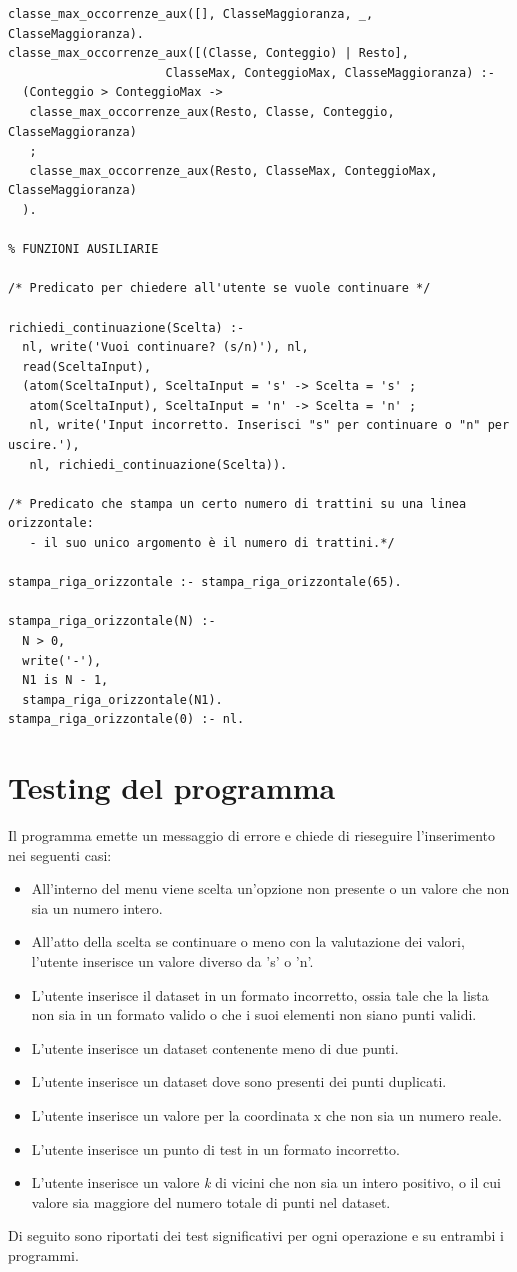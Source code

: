 \documentclass[11pt]{article}
\theoremstyle{definition}
\begin{document}
\begin{verbatim}
classe_max_occorrenze_aux([], ClasseMaggioranza, _, ClasseMaggioranza).
classe_max_occorrenze_aux([(Classe, Conteggio) | Resto], 
                      ClasseMax, ConteggioMax, ClasseMaggioranza) :-
  (Conteggio > ConteggioMax ->
   classe_max_occorrenze_aux(Resto, Classe, Conteggio, ClasseMaggioranza)
   ;  
   classe_max_occorrenze_aux(Resto, ClasseMax, ConteggioMax, ClasseMaggioranza)
  ).
   
% FUNZIONI AUSILIARIE	
	
/* Predicato per chiedere all'utente se vuole continuare */

richiedi_continuazione(Scelta) :-
  nl, write('Vuoi continuare? (s/n)'), nl,
  read(SceltaInput),
  (atom(SceltaInput), SceltaInput = 's' -> Scelta = 's' ;
   atom(SceltaInput), SceltaInput = 'n' -> Scelta = 'n' ;
   nl, write('Input incorretto. Inserisci "s" per continuare o "n" per uscire.'), 
   nl, richiedi_continuazione(Scelta)).

/* Predicato che stampa un certo numero di trattini su una linea orizzontale:
   - il suo unico argomento è il numero di trattini.*/

stampa_riga_orizzontale :- stampa_riga_orizzontale(65).

stampa_riga_orizzontale(N) :- 
  N > 0, 
  write('-'), 
  N1 is N - 1, 
  stampa_riga_orizzontale(N1).
stampa_riga_orizzontale(0) :- nl.
\end{verbatim}

\newpage

\section{Testing del programma}
\normalsize
Il programma emette un messaggio di errore e chiede di rieseguire l'inserimento nei seguenti casi:
\begin{itemize}
\item All'interno del menu viene scelta un'opzione non presente o un valore che non sia un numero intero.
\item All'atto della scelta se continuare o meno con la valutazione dei valori, l'utente inserisce un valore diverso da 's' o 'n'.
\item L'utente inserisce il dataset in un formato incorretto, ossia tale che la lista non sia in un formato valido o che i suoi elementi non siano punti validi. 
\item L'utente inserisce un dataset contenente meno di due punti.
\item L'utente inserisce un dataset dove sono presenti dei punti duplicati.
\item L'utente inserisce un valore per la coordinata x che non sia un numero reale.
\item L'utente inserisce un punto di test in un formato incorretto.
\item L'utente inserisce un valore \textit{k} di vicini che non sia un intero positivo, o il cui valore sia maggiore del numero totale di punti nel dataset.
\end{itemize}
Di seguito sono riportati dei test significativi per ogni operazione e su entrambi i programmi. 
\end{document}
